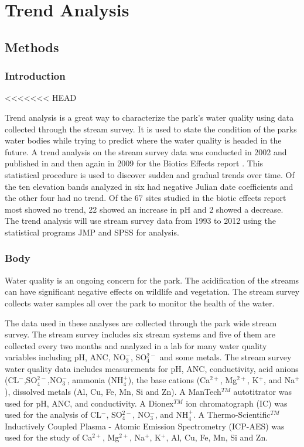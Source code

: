 \chapter{Trend Analysis}\label{ch:TA}
\section{Methods}
\subsection{Introduction}
<<<<<<< HEAD

Trend analysis is a great way to characterize the park's water quality using data collected through the stream survey. 
It is used to state the condition of the parks water bodies while trying to predict where the water quality is headed in the future. 
A trend analysis on the stream survey data was conducted in 2002 and published in \citet{robinson2008ph} and then again in 2009 for the Biotics Effects report \citep{cai2012}.
This statistical procedure is used to discover sudden and gradual trends over time. 
Of the ten elevation bands analyzed in \citet{robinson2008ph} six had negative Julian date coefficients and the other four had no trend. 
Of the 67 sites studied in the biotic effects report most showed no trend, 22 showed an increase in pH and 2 showed a decrease\citep{cai2012}. 
The trend analysis will use stream survey data from 1993 to 2012 using the statistical programs JMP and SPSS for analysis.

\subsection{Body}

Water quality is an ongoing concern for the park. 
The acidification of the streams can have significant negative effects on wildlife and vegetation. 
The stream survey collects water samples all over the park to monitor the health of the water. 
    
The data used in these analyses are collected through the park wide stream survey. 
The stream survey includes six stream systems and five of them are collected every two months and analyzed in a lab for many water quality variables including pH, ANC, NO$_3^-$, SO$_4^{2-}$ and some metals.  %
The stream survey water quality data includes measurements for pH, ANC, conductivity, acid anions (CL$^-$,SO$_4^{2-}$,NO$_3^-$, ammonia (NH$_4^+$), the base cations (Ca$^{2+}$, Mg$^{2+}$, K$^+$, and Na$^+$), dissolved metals (Al, Cu, Fe, Mn, Si and Zn).  
A ManTech$^{TM}$ autotitrator was used for pH, ANC, and conductivity.  
A Dionex$^{TM}$ ion chromatograph (IC) was used for the analysis of CL$^-$, SO$_4^{2-}$, NO$_3^-$, and NH$_4^+$.  
A Thermo-Scientific$^{TM}$ Inductively Coupled Plasma - Atomic Emission Spectrometry (ICP-AES) was used for the study of Ca$^{2+}$, Mg$^{2+}$, Na$^+$, K$^+$, Al, Cu, Fe, Mn, Si and Zn.

